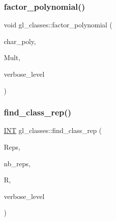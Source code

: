 \mbox{\label{classgl__classes_ab79551e3f5bc66e8049de52bd685a4ef}} 
\subsubsection{\texorpdfstring{factor\+\_\+polynomial()}{factor\_polynomial()}}
{\footnotesize\ttfamily void gl\+\_\+classes\+::factor\+\_\+polynomial (\begin{DoxyParamCaption}\item[{\mbox{\hyperlink{galois_8h_a77ca58de3d2da6172242493dd9c8aaa8}{unipoly\+\_\+object}} \&}]{char\+\_\+poly,  }\item[{\mbox{\hyperlink{galois_8h_a09fddde158a3a20bd2dcadb609de11dc}{I\+NT}} $\ast$}]{Mult,  }\item[{\mbox{\hyperlink{galois_8h_a09fddde158a3a20bd2dcadb609de11dc}{I\+NT}}}]{verbose\+\_\+level }\end{DoxyParamCaption})}

\mbox{\label{classgl__classes_a70f2dac8f79693f9b572c200131ef836}} 
\subsubsection{\texorpdfstring{find\+\_\+class\+\_\+rep()}{find\_class\_rep()}}
{\footnotesize\ttfamily \mbox{\hyperlink{galois_8h_a09fddde158a3a20bd2dcadb609de11dc}{I\+NT}} gl\+\_\+classes\+::find\+\_\+class\+\_\+rep (\begin{DoxyParamCaption}\item[{\mbox{\hyperlink{classgl__class__rep}{gl\+\_\+class\+\_\+rep}} $\ast$}]{Reps,  }\item[{\mbox{\hyperlink{galois_8h_a09fddde158a3a20bd2dcadb609de11dc}{I\+NT}}}]{nb\+\_\+reps,  }\item[{\mbox{\hyperlink{classgl__class__rep}{gl\+\_\+class\+\_\+rep}} $\ast$}]{R,  }\item[{\mbox{\hyperlink{galois_8h_a09fddde158a3a20bd2dcadb609de11dc}{I\+NT}}}]{verbose\+\_\+level }\end{DoxyParamCaption})}


